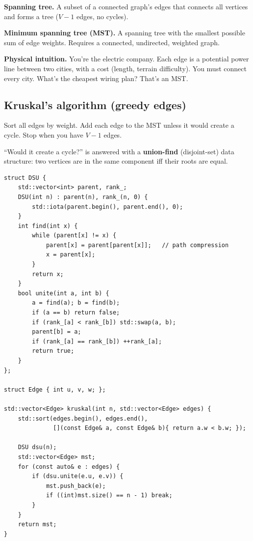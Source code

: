 \documentclass[11pt]{article}
\begin{document}
\begin{defnbox}
\textbf{Spanning tree.} A subset of a connected graph's edges that connects all vertices and forms a tree ($V-1$ edges, no cycles).

\textbf{Minimum spanning tree (MST).} A spanning tree with the smallest possible sum of edge weights. Requires a connected, undirected, weighted graph.
\end{defnbox}

\begin{examplebox}
\textbf{Physical intuition.} You're the electric company. Each edge is a potential power line between two cities, with a cost (length, terrain difficulty). You must connect every city. What's the cheapest wiring plan? That's an MST.
\end{examplebox}

\subsection*{Kruskal's algorithm (greedy edges)}

Sort all edges by weight. Add each edge to the MST unless it would create a cycle. Stop when you have $V-1$ edges.

``Would it create a cycle?'' is answered with a \textbf{union-find} (disjoint-set) data structure: two vertices are in the same component iff their roots are equal.

\begin{lstlisting}[basicstyle=\ttfamily\small,frame=single]
struct DSU {
    std::vector<int> parent, rank_;
    DSU(int n) : parent(n), rank_(n, 0) {
        std::iota(parent.begin(), parent.end(), 0);
    }
    int find(int x) {
        while (parent[x] != x) {
            parent[x] = parent[parent[x]];   // path compression
            x = parent[x];
        }
        return x;
    }
    bool unite(int a, int b) {
        a = find(a); b = find(b);
        if (a == b) return false;
        if (rank_[a] < rank_[b]) std::swap(a, b);
        parent[b] = a;
        if (rank_[a] == rank_[b]) ++rank_[a];
        return true;
    }
};

struct Edge { int u, v, w; };

std::vector<Edge> kruskal(int n, std::vector<Edge> edges) {
    std::sort(edges.begin(), edges.end(),
              [](const Edge& a, const Edge& b){ return a.w < b.w; });

    DSU dsu(n);
    std::vector<Edge> mst;
    for (const auto& e : edges) {
        if (dsu.unite(e.u, e.v)) {
            mst.push_back(e);
            if ((int)mst.size() == n - 1) break;
        }
    }
    return mst;
}
\end{lstlisting}
\end{document}
